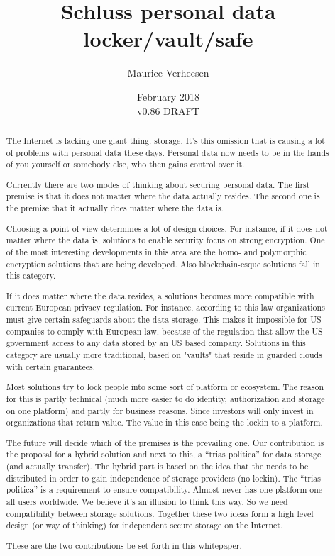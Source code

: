 \documentclass{article}
\title{Schluss personal data locker/vault/safe}
\author{Maurice Verheesen}
\date{February 2018 \\ v0.86 DRAFT}
\begin{document}
\maketitle
\begin{abstract}
The Internet is lacking one giant thing: storage. It's this omission that is causing
a lot of problems with personal data these days. Personal data now needs to be in the hands of you yourself or somebody else, who then gains control over it.

Currently there are two modes of thinking about securing personal data. The first
premise is that it does not matter where the data actually resides. The second one
is the premise that it actually does matter where the data is.

Choosing a point of view determines a lot of design choices. For instance, if it
does not matter where the data is, solutions to enable security focus on strong
encryption. One of the most interesting developments in this area are the homo- and
polymorphic encryption solutions that are being developed. Also blockchain-esque solutions fall in this category.

If it does matter where the data resides, a solutions becomes more compatible with
current European privacy regulation. For instance, according to this law organizations must give certain safeguards about the data storage. This makes it impossible for US companies to comply with European law, because of the regulation that allow the US government access to any data stored by an US based company. Solutions in this category are usually more traditional, based on "vaults" that reside in guarded clouds with
certain guarantees.

Most solutions try to lock people into some sort of platform or ecosystem. The reason for this is partly technical (much more easier to do identity, authorization and storage on one platform) and partly for business reasons. Since investors will only invest in organizations that return value. The value in this case being the lockin to a platform.

The future will decide which of the premises is the prevailing one. Our contribution
is the proposal for a hybrid solution and next to this, a ``trias politica'' for data
storage (and actually transfer). The hybrid part is based on the idea that the needs
to be distributed in order to gain independence of storage providers (no lockin). The ``trias politica'' is a requirement to ensure compatibility. Almost never has one platform one all users worldwide. We believe it's an illusion to think this way. So we need compatibility between storage solutions. Together these two ideas form a high level design (or way of thinking) for independent secure storage on the Internet.

These are the two contributions be set forth in this whitepaper.
\end{abstract}
\end{document}
